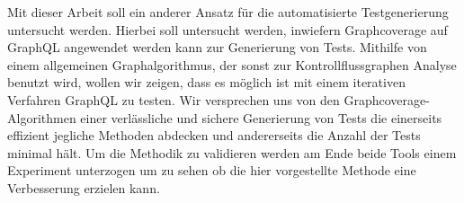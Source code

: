 Mit dieser Arbeit soll ein anderer Ansatz für die automatisierte Testgenerierung untersucht werden.
Hierbei soll untersucht werden, inwiefern Graphcoverage auf GraphQL angewendet werden kann zur Generierung von
Tests.
Mithilfe von einem allgemeinen Graphalgorithmus, der sonst zur Kontrollflussgraphen Analyse benutzt wird, wollen wir zeigen,
dass es möglich ist mit einem iterativen Verfahren GraphQL zu testen.
Wir versprechen uns von den Graphcoverage-Algorithmen einer verlässliche und sichere Generierung von Tests die
einerseits effizient jegliche Methoden abdecken und andererseits die Anzahl der Tests minimal hält.
Um die Methodik zu validieren werden am Ende beide Tools einem Experiment unterzogen um zu sehen ob die hier
vorgestellte Methode eine Verbesserung erzielen kann.




